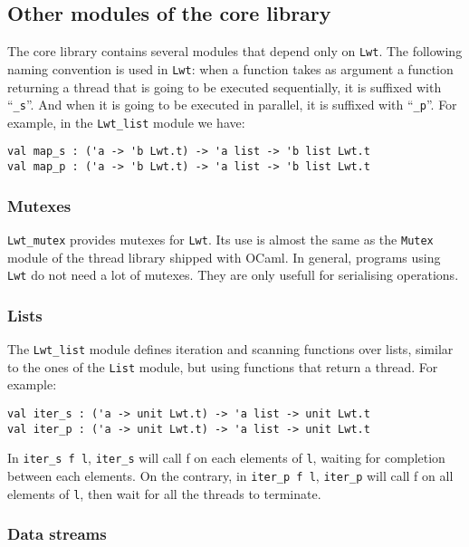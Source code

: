 \documentclass{article}
\newcommand{\lwt}{\texttt{Lwt}\xspace}
\begin{document}
\subsection{Other modules of the core library}

The core library contains several modules that depend only on
\lwt. The following naming convention is used in \lwt: when a
function takes as argument a function returning a thread that is going
to be executed sequentially, it is suffixed with ``\texttt{\_s}''. And
when it is going to be executed in parallel, it is suffixed with
``\texttt{\_p}''. For example, in the \texttt{Lwt\_list} module we have:

\begin{verbatim}
val map_s : ('a -> 'b Lwt.t) -> 'a list -> 'b list Lwt.t
val map_p : ('a -> 'b Lwt.t) -> 'a list -> 'b list Lwt.t
\end{verbatim}

\subsubsection{Mutexes}

\texttt{Lwt\_mutex} provides mutexes for \lwt. Its use is almost the
same as the \texttt{Mutex} module of the thread library shipped with
OCaml. In general, programs using \lwt do not need a lot of
mutexes. They are only usefull for serialising operations.

\subsubsection{Lists}

The \texttt{Lwt\_list} module defines iteration and scanning functions
over lists, similar to the ones of the \texttt{List} module, but using
functions that return a thread. For example:

\begin{verbatim}
val iter_s : ('a -> unit Lwt.t) -> 'a list -> unit Lwt.t
val iter_p : ('a -> unit Lwt.t) -> 'a list -> unit Lwt.t
\end{verbatim}

In \texttt{iter\_s f l}, \texttt{iter\_s} will call f on each elements
of \texttt{l}, waiting for completion between each elements. On the
contrary, in \texttt{iter\_p f l}, \texttt{iter\_p} will call f on all
elements of \texttt{l}, then wait for all the threads to terminate.

\subsubsection{Data streams}
\end{document}
